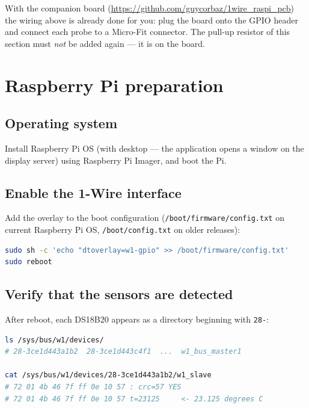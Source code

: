 \documentclass[11pt,a4paper,parskip=half]{scrartcl}
\newcommand{\code}[1]{\texttt{#1}}
\begin{document}
\begin{note}[title={Using the interface PCB}]
With the companion board (\url{https://github.com/guycorbaz/1wire_raspi_pcb})
the wiring above is already done for you: plug the board onto the GPIO
header and connect each probe to a Micro-Fit connector. The pull-up resistor
of this section must \emph{not} be added again --- it is on the board.
\end{note}

\section{Raspberry Pi preparation}

\subsection{Operating system}

Install Raspberry Pi OS (with desktop --- the application opens a window on
the display server) using Raspberry Pi Imager, and boot the Pi.

\subsection{Enable the 1-Wire interface}

Add the overlay to the boot configuration
(\code{/boot/firmware/config.txt} on current Raspberry Pi OS,
\code{/boot/config.txt} on older releases):

\begin{lstlisting}[language=bash]
sudo sh -c 'echo "dtoverlay=w1-gpio" >> /boot/firmware/config.txt'
sudo reboot
\end{lstlisting}

\subsection{Verify that the sensors are detected}

After reboot, each DS18B20 appears as a directory beginning with \code{28-}:

\begin{lstlisting}[language=bash]
ls /sys/bus/w1/devices/
# 28-3ce1d443a1b2  28-3ce1d443c4f1  ...  w1_bus_master1

cat /sys/bus/w1/devices/28-3ce1d443a1b2/w1_slave
# 72 01 4b 46 7f ff 0e 10 57 : crc=57 YES
# 72 01 4b 46 7f ff 0e 10 57 t=23125     <- 23.125 degrees C
\end{lstlisting}
\end{document}
